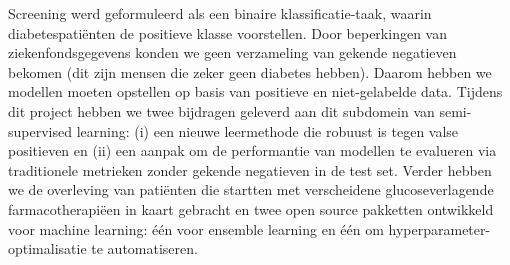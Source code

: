 
Screening werd geformuleerd als een binaire klassificatie-taak, waarin diabetespati\"enten de positieve klasse voorstellen. Door beperkingen van ziekenfondsgegevens konden we geen verzameling van gekende negatieven bekomen (dit zijn mensen die zeker geen diabetes hebben). Daarom hebben we modellen moeten opstellen op basis van positieve en niet-gelabelde data. Tijdens dit project hebben we twee bijdragen geleverd aan dit subdomein van semi-supervised learning: (i) een nieuwe leermethode die robuust is tegen valse positieven en (ii) een aanpak om de performantie van modellen te evalueren via traditionele metrieken zonder gekende negatieven in de test set. Verder hebben we de overleving van pati\"enten die startten met verscheidene glucoseverlagende farmacotherapi\"een in kaart gebracht en twee open source pakketten ontwikkeld voor machine learning: \'e\'en voor ensemble learning en \'e\'en om hyperparameter-optimalisatie te automatiseren.


